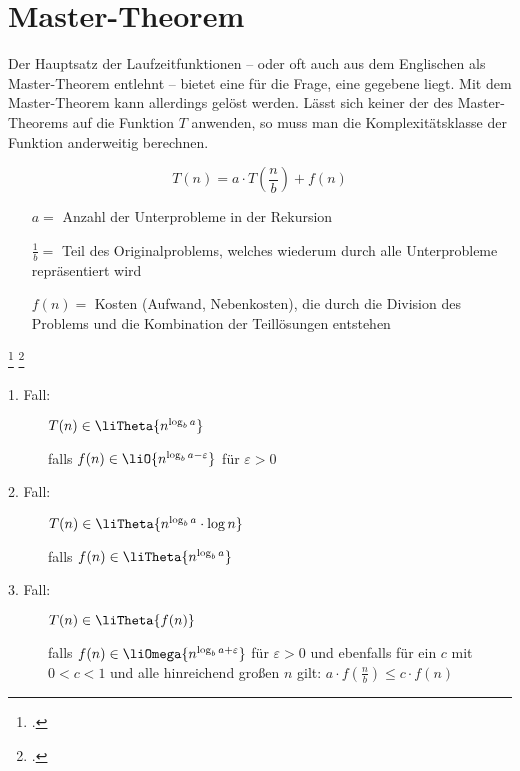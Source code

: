 \documentclass{lehramt-informatik-haupt}
\begin{document}
\let\T=\liTheta
\let\O=\liO
\let\o=\liOmega

\section{Master-Theorem}

Der Hauptsatz der Laufzeitfunktionen – oder oft auch aus dem Englischen
als Master-Theorem entlehnt – bietet eine  für
die Frage,  eine gegebene
 liegt. Mit dem Master-Theorem kann
allerdings  gelöst
werden. Lässt sich keiner der  des
Master-Theorems auf die Funktion $T$ anwenden, so muss man die
Komplexitätsklasse der Funktion anderweitig berechnen.

\begin{displaymath}
T(n) = a \cdot T \left( \textstyle{\frac{n}{b}} \right) + f(n)
\end{displaymath}

\begin{itemize}
\item[$a =$]
Anzahl der Unterprobleme in der Rekursion

\item[$\textstyle{\frac{1}{b}} =$]
Teil des Originalproblems, welches wiederum durch alle Unterprobleme
repräsentiert wird

\item[$f(n) =$]
Kosten (Aufwand, Nebenkosten), die durch die Division des Problems und
die Kombination der Teillösungen entstehen
\end{itemize}
\footcite{wiki:master-theorem}
\footcite[Seite 19-35 (PDF 11-24)]{aud:fs:2}

\begin{description}
\item[1. Fall:]
$T(n) \in \T{n^{\log_{b}a}}$

\hfill falls $f(n) \in \O{n^{\log_{b} a - \varepsilon}}$
für $\varepsilon > 0$

\item[2. Fall:]
$T(n) \in \T{n^{\log_{b}a} \cdot \log n}$

\hfill falls $f(n) \in \T{n^{\log_{b}a}}$

\item[3. Fall:]
$T(n) \in \T{f(n)}$

\hfill falls $f(n) \in \o{n^{\log_{b} a + \varepsilon}}$
für $\varepsilon > 0$
und ebenfalls für ein $c$ mit $0 < c < 1$ und alle hinreichend großen $n$
gilt:
$a \cdot f(\textstyle {\frac {n}{b}})\leq c \cdot f(n)$
\end{description}

\literatur
\end{document}

